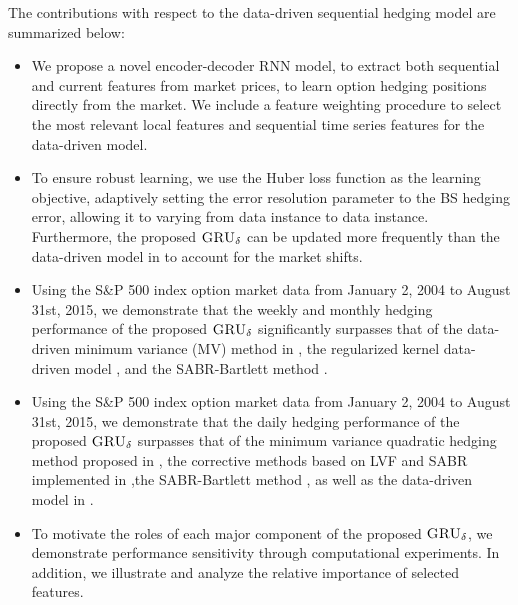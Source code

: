 \documentclass[letterpaper,12pt,titlepage,oneside,final]{book}
\numberwithin{equation}{section}
\theoremstyle{definition}
\newcommand{\model}{\textsc{GRU}_\delta}
\begin{document}
The contributions with respect to the data-driven sequential hedging model \cite{knian2019} are summarized below:
\begin{itemize}
	\item  We propose a novel encoder-decoder  RNN model, to extract both sequential and current features from market prices, to learn option hedging positions directly from the market. We include a feature weighting procedure to select the most relevant local features and sequential time series features for the data-driven model.
	\item To ensure robust learning, we use the Huber loss function as the learning objective,  adaptively setting the error resolution parameter to the BS hedging error, allowing it to varying from data instance to data instance. Furthermore,    the proposed $\model$ can be updated more frequently than the data-driven model in \cite{knian2017} to account for the market shifts.
	\item Using the S\&P 500 index option market data from January 2, 2004 to  August 31st, 2015, we demonstrate that the weekly and monthly hedging performance of the proposed $\model$ significantly surpasses that
 of the data-driven minimum variance (MV) method in \citep{hulloptimal}, the regularized kernel data-driven model \citep{knian2017}, and the SABR-Bartlett method \cite{bartlett2006hedging}.
	\item Using the S\&P 500 index option market data from January 2, 2004 to  August 31st, 2015, we demonstrate that
	the daily hedging performance of the proposed $\model$ surpasses that of the minimum variance quadratic hedging method  proposed in \cite{hulloptimal}, the corrective methods
	based on LVF and SABR implemented in \cite{hulloptimal},the SABR-Bartlett method \cite{bartlett2006hedging}, as well as the data-driven model in \cite{knian2017}.
	\item To motivate the roles of each major component of the proposed $\model$, we demonstrate performance sensitivity through computational experiments. In addition, we illustrate and analyze the relative importance of selected features.
\end{itemize}
\end{document}
